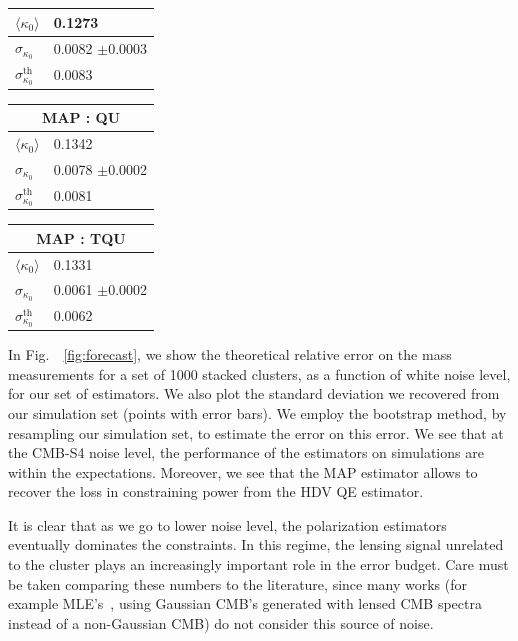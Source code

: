 \documentclass[prd, superscriptaddress, tightenlines, longbibliography, nofootinbib, eqsecnum, amsfonts, amsmath, floatfix, twocolumn, notitlepage]{revtex4-2}
\begin{document}
\begin{table}[]
\begin{tabularx}{0.15\textwidth}{|X|X|}
    $\langle\kappa_0 \rangle$      & 0.1273   \\ \hline
    $\sigma_{\kappa_0}$ & 0.0082 $\pm$0.0003  \\\hline
    $\sigma_{\kappa_0}^{\text{th}}$ & 0.0083  \\\hline
    \end{tabularx}
    \begin{tabularx}{0.15\textwidth}{|X|X|}
    \hline
    \multicolumn{2}{|c|}{MAP : QU} \\ \hline
    $\langle\kappa_0 \rangle$      & 0.1342   \\ \hline
    $\sigma_{\kappa_0}$ & 0.0078 $\pm$0.0002 \\\hline
    $\sigma_{\kappa_0}^{\text{th}}$ & 0.0081  \\\hline
    \end{tabularx}
    \begin{tabularx}{0.15\textwidth}{|X|X|}
    \hline
    \multicolumn{2}{|c|}{MAP : TQU} \\ \hline
    $\langle\kappa_0 \rangle$      & 0.1331   \\ \hline
    $\sigma_{\kappa_0}$ & 0.0061 $\pm$0.0002 \\\hline
    $\sigma_{\kappa_0}^{\text{th}}$ & 0.0062  \\\hline
    \end{tabularx}
    \label{tab:results}
\end{table}

In Fig.~~\ref{fig:forecast}, we show the theoretical relative error on the mass measurements for a set of 1000 stacked clusters, as a function of white noise level, for our set of estimators. We also plot the standard deviation we recovered from our simulation set (points with error bars). We employ the bootstrap method, by resampling our simulation set, to estimate the error on this error. 
We see that at the CMB-S4 noise level, the performance of the estimators on simulations are within the expectations. Moreover, we see that the MAP estimator allows to recover the loss in constraining power from the HDV QE estimator.

It is clear that as we go to lower noise level, the polarization estimators eventually dominates the constraints. In this regime, the lensing signal unrelated to the cluster plays an increasingly important role in the error budget. Care must be taken comparing these numbers to the literature, since many works (for example MLE's~\cite{Raghunathan:2017cle}, using Gaussian CMB's generated with lensed CMB spectra instead of a non-Gaussian CMB) do not consider this source of noise.
\end{document}
